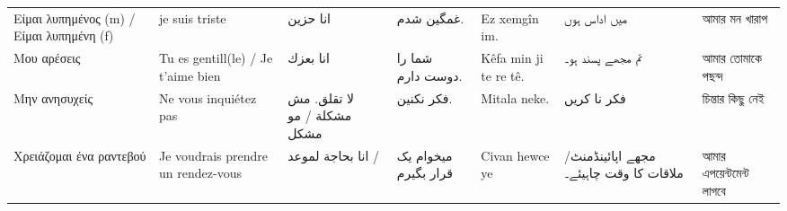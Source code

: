 \begin{longtable}{p{3.5cm} p{3.5cm} p{3.5cm} p{3.5cm} p{3.5cm} p{3.5cm} p{3.5cm} }
 Είμαι λυπημένος (m) / Είμαι λυπημένη (f)                                                                                      & je suis triste                                                                                  & انا حزین                                                                              & غمگین شدم.                                                  & Ez xemgîn im.                                                                      & میں  اداس ہوں                                                                  & আমার মন খারাপ                                                     \\
 Μου αρέσεις                                                                                                                   & Tu es gentill(le) / Je t'aime bien                                                              & انا بعزك                                                                              & شما را دوست دارم.                                           & Kêfa min ji te re tê.                                                              & تم مجھے پسند ہو۔                                                               & আমার তোমাকে পছন্দ                                                 \\
 Μην ανησυχείς                                                                                                                 & Ne vous inquiétez pas                                                                           & لا تقلق. مش مشكلة    / مو مشكل                                                        & فکر نکنین.                                                  & Mitala neke.                                                                       & فکر نا کریں                                                                    & চিন্তার কিছু নেই                                                  \\
 Χρειάζομαι ένα ραντεβού                                                                                                       & Je voudrais prendre un rendez-vous                                                              & انا بحاجة لموعد /                                                                     & میخوام یک قرار بگیرم                                        & Civan hewce ye                                                                     & مجھے اپائینڈمنٹ/ملاقات کا وقت چاہیئے۔                                          & আমার এপয়েন্টমেন্ট লাগবে                                           \\

\end{longtable}
